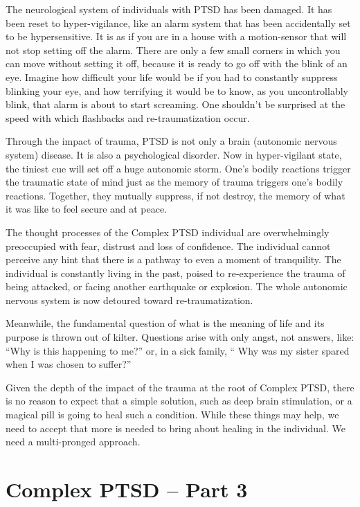 \documentclass[]{book}
\begin{document}
The neurological system of individuals with PTSD has been damaged. It has been reset to hyper-vigilance, like an alarm system that has been accidentally set to be hypersensitive. It is as if you are in a house with a motion-sensor that will not stop setting off the alarm. There are only a few small corners in which you can move without setting it off, because it is ready to go off with the blink of an eye. Imagine how difficult your life would be if you had to constantly suppress blinking your eye, and how terrifying it would be to know, as you uncontrollably blink, that alarm is about to start screaming. One shouldn't be surprised at the speed with which flashbacks and re-traumatization occur.

Through the impact of trauma, PTSD is not only a brain (autonomic nervous system) disease. It is also a psychological disorder. Now in hyper-vigilant state, the tiniest cue will set off a huge autonomic storm. One's bodily reactions trigger the traumatic state of mind just as the memory of trauma triggers one's bodily reactions. Together, they mutually suppress, if not destroy, the memory of what it was like to feel secure and at peace.

The thought processes of the Complex PTSD individual are overwhelmingly preoccupied with fear, distrust and loss of confidence. The individual cannot perceive any hint that there is a pathway to even a moment of tranquility. The individual is constantly living in the past, poised to re-experience the trauma of being attacked, or facing another earthquake or explosion. The whole autonomic nervous system is now detoured toward re-traumatization.

Meanwhile, the fundamental question of what is the meaning of life and its purpose is thrown out of kilter. Questions arise with only angst, not answers, like: ``Why is this happening to me?'' or, in a sick family, `` Why was my sister spared when I was chosen to suffer?''

Given the depth of the impact of the trauma at the root of Complex PTSD, there is no reason to expect that a simple solution, such as deep brain stimulation, or a magical pill is going to heal such a condition. While these things may help, we need to accept that more is needed to bring about healing in the individual. We need a multi-pronged approach.

\hypertarget{complex-ptsd-part-3}{%
\section{Complex PTSD -- Part 3}\label{complex-ptsd-part-3}}
\end{document}
